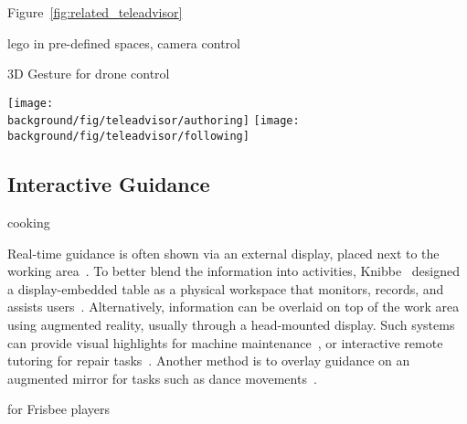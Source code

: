 Figure~\ref{fig:related_teleadvisor}
%

lego in pre-defined spaces, camera control~\cite{Ranjan:2007}

3D Gesture for drone control~\cite{Cauchard:2015:DME:2750858.2805823,Pfeil:2013:EGM:2449396.2449429}

\begin{figure*}[t!]
  \centering
  \texttt{[image: \\background/fig/teleadvisor/authoring]}
  \texttt{[image: \\background/fig/teleadvisor/following]}
  \caption{TeleAdvisor~\cite{Gurevich:2012ko} provides an authoring interface (left) for an instructor to guide a remote worker through a repair task (right).}
  \label{fig:related_teleadvisor}
\end{figure*}


\subsection{Interactive Guidance}
cooking

Real-time guidance is often shown via an external display, placed next to the working area~\cite{Gupta:2012ku}. To better blend the information into activities, Knibbe~\ea{} designed a display-embedded table as a physical workspace that monitors, records, and assists users~\cite{Knibbe:2015:SMI:2817721.2817741}.
%
Alternatively, information can be overlaid on top of the work area using augmented reality, usually through a head-mounted display. Such systems can provide visual highlights for machine maintenance~\cite{Henderson:2011ff}, or interactive remote tutoring for repair tasks~\cite{Gurevich:2012ko}.
%
Another method is to overlay guidance on an augmented mirror for tasks such as dance movements~\cite{Anderson:2013:YEM:2501988.2502045}.

for Frisbee players~\cite{Solomon:2014:UTI:2540930.2540965}



